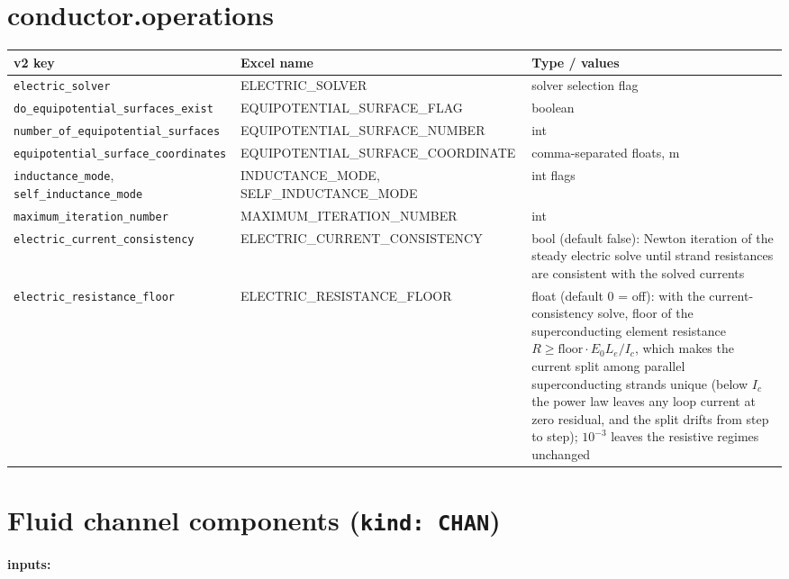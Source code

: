 \documentclass[10pt,a4paper]{article}
\newcommand{\code}[1]{\texttt{#1}}
\begin{document}
\section*{conductor.operations}

\begin{longtable}{p{5.9cm}p{4.6cm}p{4.6cm}}
\toprule
\textbf{v2 key} & \textbf{Excel name} & \textbf{Type / values} \\
\midrule
\endhead
\code{electric\_solver} & ELECTRIC\_SOLVER & solver selection flag \\
\code{do\_equipotential\_surfaces\_exist} & EQUIPOTENTIAL\_SURFACE\_FLAG & boolean \\
\code{number\_of\_equipotential\_surfaces} & EQUIPOTENTIAL\_SURFACE\_NUMBER & int \\
\code{equipotential\_surface\_coordinates} & EQUIPOTENTIAL\_SURFACE\_COORDINATE & comma-separated floats, m \\
\code{inductance\_mode}, \code{self\_inductance\_mode} & INDUCTANCE\_MODE, SELF\_INDUCTANCE\_MODE & int flags \\
\code{maximum\_iteration\_number} & MAXIMUM\_ITERATION\_NUMBER & int \\
\code{electric\_current\_consistency} & ELECTRIC\_CURRENT\_CONSISTENCY & bool (default false): Newton iteration of the steady electric solve until strand resistances are consistent with the solved currents \\
\code{electric\_resistance\_floor} & ELECTRIC\_RESISTANCE\_FLOOR & float (default 0 = off): with the current-consistency solve, floor of the superconducting element resistance $R \ge \mathrm{floor}\cdot E_0 L_e / I_c$, which makes the current split among parallel superconducting strands unique (below $I_c$ the power law leaves any loop current at zero residual, and the split drifts from step to step); $10^{-3}$ leaves the resistive regimes unchanged \\
\bottomrule
\end{longtable}

\section*{Fluid channel components (\code{kind: CHAN})}

\textbf{inputs:}
\end{document}

